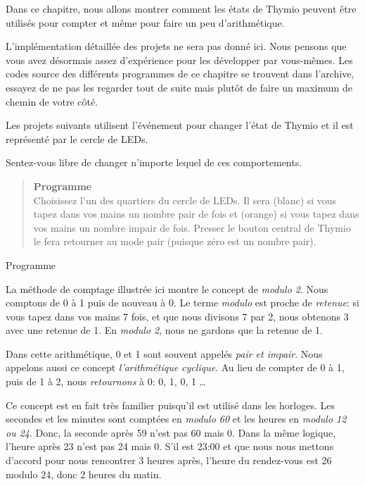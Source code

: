 
\label{ch.counting}

Dans ce chapitre, nous allons montrer comment les états de Thymio peuvent être utilisés pour compter et même pour faire un peu d'arithmétique. 

L'implémentation détaillée des projets ne sera pas donné ici. Nous pensons que vous avez désormais assez d'expérience pour les développer par vous-mêmes. Les codes source des différents programmes de ce chapitre se trouvent dans l'archive, essayez de ne pas les regarder tout de suite mais plutôt de faire un maximum de chemin de votre côté.

Les projets suivants utilisent l'événement  pour changer l'état de Thymio et il est représenté par le cercle de LEDs.


Sentez-vous libre de changer n'importe lequel de ces comportements.


\begin{quote}
\textbf{Programme}\\Choisissez l'un des quartiers du cercle de LEDs. Il sera  (blanc) si vous tapez dans vos mains un nombre pair de fois et  (orange) si vous tapez dans vos mains un nombre impair de fois. Presser le bouton central de Thymio le fera retourner au mode pair (puisque zéro est un nombre pair).
\end{quote}

{\raggedleft \hfill Programme }

La méthode de comptage illustrée ici montre le concept de \emph{modulo 2}. Nous comptons de 0 à 1 puis de nouveau à 0. Le terme \emph{modulo} est proche de \emph{retenue}: si vous tapez dans vos mains 7 fois, et que nous divisons 7 par 2, nous obtenons 3 avec une retenue de 1. En \emph{modulo 2}, nous ne gardons que la retenue de 1.

Dans cette arithmétique, 0 et 1 sont souvent appelés \emph{pair et impair}. Nous appelons aussi ce concept \emph{l'arithmétique cyclique}. Au lieu de compter de 0 à 1, puis de 1 à 2, nous \emph{retournons} à 0: 0, 1, 0, 1 \ldots

Ce concept est en fait très familier puisqu'il est utilisé dans les horloges. Les secondes et les minutes sont comptées en \emph{modulo 60} et les heures en \emph{modulo 12 ou 24}. Donc, la seconde après 59 n'est pas 60 mais 0. Dans la même logique, l'heure après 23 n'est pas 24 mais 0. S'il est 23:00 et que nous nous mettons d'accord pour nous rencontrer 3 heures après, l'heure du rendez-vous est 26 modulo 24, donc 2 heures du matin.

